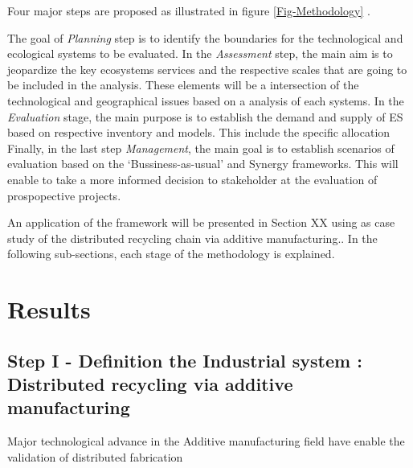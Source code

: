 \documentclass[
]{article}
\begin{document}
Four major steps are proposed as illustrated in figure \ref{Fig-Methodology} .

The goal of \emph{Planning} step is to identify the boundaries for the technological and ecological systems to be evaluated.
In the \emph{Assessment} step, the main aim is to jeopardize the key ecosystems services and the respective scales that are going to be included in the analysis.
These elements will be a intersection of the technological and geographical issues based on a analysis of each systems.
In the \emph{Evaluation} stage, the main purpose is to establish the demand and supply of ES based on respective inventory and models. This include the specific allocation
Finally, in the last step \emph{Management}, the main goal is to establish scenarios of evaluation based on the `Bussiness-as-usual' and Synergy frameworks.
This will enable to take a more informed decision to stakeholder at the evaluation of prospopective projects.

An application of the framework will be presented in Section XX using as case study of the distributed recycling chain via additive manufacturing..
In the following sub-sections, each stage of the methodology is explained.

\hypertarget{results}{%
\section{Results}\label{results}}

\hypertarget{step-i---definition-the-industrial-system-distributed-recycling-via-additive-manufacturing}{%
\subsection{Step I - Definition the Industrial system : Distributed recycling via additive manufacturing}\label{step-i---definition-the-industrial-system-distributed-recycling-via-additive-manufacturing}}

Major technological advance in the Additive manufacturing field have enable the validation of distributed fabrication
\end{document}

